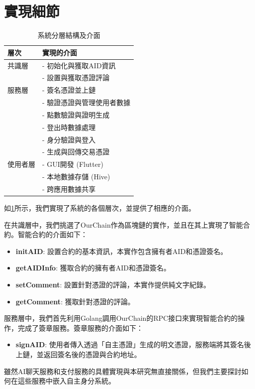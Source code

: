 \section{實現細節}
\begin{table}[htbp]
  \centering
  \caption{系統分層結構及介面}
  \label{tab:system-interfaces}
  \begin{tabularx}{\textwidth}{|l|X|}
    \hline
    \textbf{層次} & \textbf{實現的介面}    \\
    \hline
    共識層         & - 初始化與獲取AID資訊     \\
                & - 設置與獲取憑證評論       \\
    \hline
    服務層         & - 簽名憑證並上鏈         \\
                & - 驗證憑證與管理使用者數據     \\
                & - 點數驗證與證明生成       \\
                & - 登出時數據處理         \\
                & - 身分驗證與登入         \\
                & - 生成與回傳交易憑證       \\
    \hline
    使用者層         & - GUI開發 (Flutter) \\
                & - 本地數據存儲 (Hive)   \\
                & - 跨應用數據共享         \\
    \hline
  \end{tabularx}
\end{table}
如\ref{tab:system-interfaces}所示，我們實現了系統的各個層次，並提供了相應的介面。

在共識層中，我們挑選了OurChain\cite{ourlab408_ourchain}作為區塊鏈的實作，並且在其上實現了智能合約。智能合約的介面如下：
\begin{itemize}
  \item \textbf{initAID}: 設置合約的基本資訊，本實作包含擁有者AID和憑證簽名。
  \item \textbf{getAIDInfo}: 獲取合約的擁有者AID和憑證簽名。
  \item \textbf{setComment}: 設置針對憑證的評論，本實作提供純文字紀錄。
  \item \textbf{getComment}: 獲取針對憑證的評論。
\end{itemize}
服務層中，我們首先利用Golang調用OurChain的RPC接口來實現智能合約的操作，完成了簽章服務。簽章服務的介面如下：
\begin{itemize}
  \item \textbf{signAID}: 使用者傳入透過「自主憑證」生成的明文憑證，服務端將其簽名後上鏈，並返回簽名後的憑證與合約地址。
\end{itemize}
雖然AI聊天服務和支付服務的具體實現與本研究無直接關係，但我們主要探討如何在這些服務中嵌入自主身分系統。


